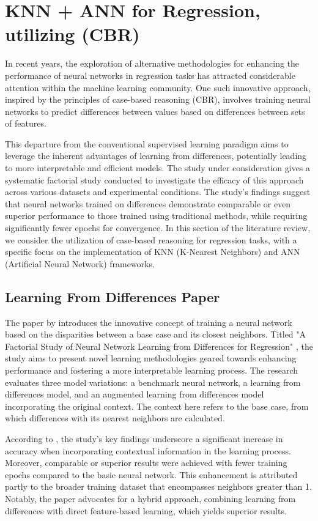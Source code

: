 \documentclass[a4paper, 12pt]{report}
\begin{document}
\section{KNN + ANN for Regression, utilizing  (CBR)}
In recent years, the exploration of alternative methodologies for enhancing the performance of neural networks in 
regression tasks has attracted considerable attention within the machine learning community. One such innovative approach, 
inspired by the principles of case-based reasoning (CBR), involves training neural networks to predict differences between values based on differences 
between sets of features. 

This departure from the conventional supervised learning paradigm aims to leverage the inherent advantages of learning from differences, 
potentially leading to more interpretable and efficient models. 
The study under consideration \cite{learningFromDifferences2022} gives a systematic factorial study conducted to 
investigate the efficacy of this approach across various datasets and experimental conditions. 
The study's findings suggest that neural networks trained on differences demonstrate comparable or even superior performance to those 
trained using traditional methods, while requiring significantly fewer epochs for convergence. 
In this section of the literature review, 
we consider the utilization of case-based reasoning for regression tasks, with a specific focus on the implementation of KNN (K-Nearest Neighbors) and ANN (Artificial Neural Network) frameworks.

\subsection{Learning From Differences Paper}
The paper by \cite{learningFromDifferences2022} introduces the innovative concept of training a 
neural network based on the disparities between a base case and its closest neighbors. 
Titled "A Factorial Study of Neural Network Learning from Differences for Regression" \cite{learningFromDifferences2022}, the study aims to 
present novel learning methodologies geared towards enhancing performance and fostering a more interpretable learning process.
The research evaluates three model variations: a benchmark neural network, a learning from differences model, and an augmented learning from differences model incorporating the original context. 
The context here refers to the base case, from which differences with its nearest neighbors are calculated.

According to \cite{learningFromDifferences2022}, the study's key findings underscore a significant increase in accuracy when incorporating contextual information in the learning process. 
Moreover, comparable or superior results were achieved with fewer training epochs compared to the basic neural network. 
This enhancement is attributed partly to the broader training dataset that encompasses neighbors greater than 1. 
Notably, the paper advocates for a hybrid approach, combining learning from differences with direct feature-based learning, which yields superior results.
\end{document}
